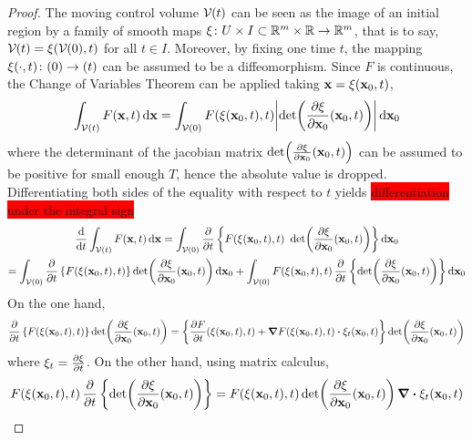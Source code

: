 \begin{proof}
	The moving control volume $\mathcal{V}_{}(t)$ can be seen as the image of an initial region by a family of smooth maps $\xi \colon U \times I \subset \mathbb{R}^m \times \mathbb{R} \rightarrow \mathbb{R}^m$, that is to say, $\mathcal{V}_{}(t) = \xi(\mathcal{V}_{}(0),t)$ for all $t \in I$. Moreover, by fixing one time $t$, the mapping $\xi(\cdot, t) \colon \vb{}(0) \rightarrow \vb{}(t)$ can be assumed to be a diffeomorphism. Since $F$ is continuous, the Change of Variables Theorem can be applied taking $\vb{x} = \xi(\vb{x}_0,t)$,
	\begin{equation*}
		\int_{\mathcal{V}_{}(t)} F(\vb{x},t) \dd{\vb{x}} = 
		\int_{\mathcal{V}_{}(0)} F(\xi(\vb{x}_0,t), t) \abs{\det(\frac{\partial \xi}{\partial \vb{x}_0} (\vb{x}_0, t))} \dd{\vb{x}_0}
	\end{equation*}
	where the determinant of the jacobian matrix $\det(\frac{\partial \xi}{\partial \vb{x}_0} (\vb{x}_0, t))$ can be assumed to be positive for small enough $T$, hence the absolute value is dropped. Differentiating both sides of the equality with respect to $t$ yields \colorbox{red}{differentiation under the integral sign}
	\begin{multline*}
		\frac{\dd}{\dd{t}} \int_{\mathcal{V}_{}(t)} F(\vb{x}, t) \dd{\vb{x}} = 
		\int_{\mathcal{V}_{}(0)} \pdv{t} 
		\left\{
		F(\xi(\vb{x}_0,t), t) \ \det(\frac{\partial \xi}{\partial \vb{x}_0} (\vb{x}_0, t))
		\right\}
		\dd{\vb{x}_0} 
		\\
		= 
		\int_{\mathcal{V}_{}(0)} 
		\pdv{t} \left\{ F(\xi(\vb{x}_0,t), t) \right\} \det(\frac{\partial \xi}{\partial \vb{x}_0} (\vb{x}_0, t)) \dd{\vb{x}_0} + 
		\int_{\mathcal{V}_{}(0)} F(\xi(\vb{x}_0,t), t) \, \pdv{t} \left\{ \det(\frac{\partial \xi}{\partial \vb{x}_0} (\vb{x}_0, t)) \right\} \dd{\vb{x}_0}
	\end{multline*}
	On the one hand,
	\begin{equation*}
		\pdv{t} \left\{ F(\xi(\vb{x}_0,t), t) \right\} \det(\frac{\partial \xi}{\partial \vb{x}_0} (\vb{x}_0, t)) = 
		\left\{ 
		\frac{\partial F}{\partial t} (\xi(\vb{x}_0, t), t) + 
		\grad{F(\xi(\vb{x}_0, t), t)} \vdot \xi_t (\vb{x}_0, t)
		\right\}
		\det(\frac{\partial \xi}{\partial \vb{x}_0} (\vb{x}_0, t))
	\end{equation*}
	where $\xi_t = \pdv{\xi}{t}$. On the other hand, using matrix calculus,
	\begin{equation*}
		F(\xi(\vb{x}_0,t), t) \, \pdv{t} \left\{ \det(\frac{\partial \xi}{\partial \vb{x}_0} (\vb{x}_0, t)) \right\} = 
		F(\xi(\vb{x}_0,t), t) \det(\frac{\partial \xi}{\partial \vb{x}_0} (\vb{x}_0, t)) \, \div{\xi_t(\vb{x}_0,t)}

\end{equation*}
\end{proof}
